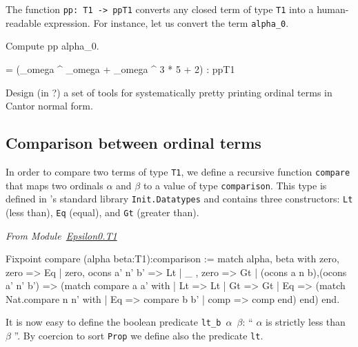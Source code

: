 The function \texttt{pp: T1 -> ppT1} converts any closed term of type \texttt{T1} into a human-readable expression. For instance, let us convert the term \texttt{alpha\_0}.

\begin{Coqsrc}
Compute pp alpha_0.
\end{Coqsrc}

\begin{Coqanswer}
     = (_omega ^ _omega + _omega ^ 3 * 5 + 2)%
     : ppT1
\end{Coqanswer}

\begin{project}
Design  (in \ocaml?) a set of tools for systematically pretty printing ordinal terms in Cantor normal form.
\end{project}


\subsection{Comparison between ordinal terms}
\label{sec:orgheadline73}



In order to compare two terms of type \texttt{T1}, we define a recursive function \texttt{compare} that maps two ordinals $\alpha$ and $\beta$ to a value of type \texttt{comparison}. This type is defined in \coq's standard library 
\texttt{Init.Datatypes} and
contains three constructors:  \texttt{Lt} (less than), \texttt{Eq} (equal), and
\texttt{Gt} (greater than).


\vspace{4pt}
\emph{From Module~\href{../theories/html/hydras.Epsilon0.T1.html\#compare}{Epsilon0.T1}}


\begin{Coqsrc}
Fixpoint compare (alpha beta:T1):comparison :=
  match alpha, beta with
    zero, zero => Eq
  | zero, ocons a' n' b' => Lt
  | _   , zero => Gt
  | (ocons a n b),(ocons a' n' b') =>
      (match compare a a' with 
       | Lt => Lt
       | Gt => Gt
       | Eq => (match Nat.compare n n' with
                | Eq => compare b b'
                | comp => comp
                end)
       end)
  end.
\end{Coqsrc}
 
It is now easy to define the boolean predicate \texttt{lt\_b $\alpha$ $\beta$}: 
`` $\alpha$ is strictly less than $\beta$ ''. By coercion to sort \texttt{Prop} we define also the predicate \texttt{lt}.

